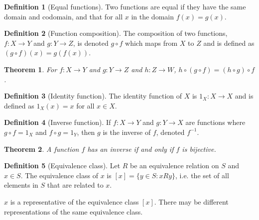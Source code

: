 \documentclass{article}
\theoremstyle{plain}
\newtheorem{theorem}{Theorem}[section]
\numberwithin{theorem}{section}
\theoremstyle{definition}
\newtheorem{definition}{Definition}[section]
\numberwithin{definition}{section}
\begin{document}
%
\begin{definition}[Equal functions]
    Two functions are equal if they have the same domain and codomain,
    and that for all $x$ in the domain $f(x) = g(x)$.
\end{definition}
%
\begin{definition}[Function composition]
    The composition of two functions, $f:X \to Y$ and $g:Y \to Z$,
    is denoted $g \circ f$ which maps from $X$ to $Z$ and is defined as
    $(g \circ f)(x) = g(f(x))$.
\end{definition}
%
\begin{theorem}
    For $f:X \to Y$ and $g:Y \to Z$ and  $h:Z \to W$,
    $h \circ (g \circ f) = (h \circ g) \circ f$.
\end{theorem}
%
\begin{definition}[Identity function]
    The identity function of $X$ is $1_X:X \to X$ and is defined as
    $1_X (x)=x$ for all $x \in X$.
\end{definition}
%
\begin{definition}[Inverse function]
    If $f:X \to Y$ and $g:Y \to X$ are functions where
    $g \circ f = 1_X$ and $f \circ g = 1_Y$,
    then $g$ is the inverse of $f$, denoted $f^{-1}$.
\end{definition}
%
\begin{theorem}
    A function $f$ has an inverse if and only if $f$ is bijective.
\end{theorem}
%
\begin{definition}[Equivalence class]
    Let $R$ be an equivalence relation on $S$ and $x \in S$.
    The equivalence class of $x$ is $[x] = \{y \in S : xRy\}$,
    i.e. the set of all elements in $S$ that are related to $x$.

    $x$ is a representative of the equivalence class $[x]$.
    There may be different representations of the same equivalence class.
\end{definition}
%
\end{document}
